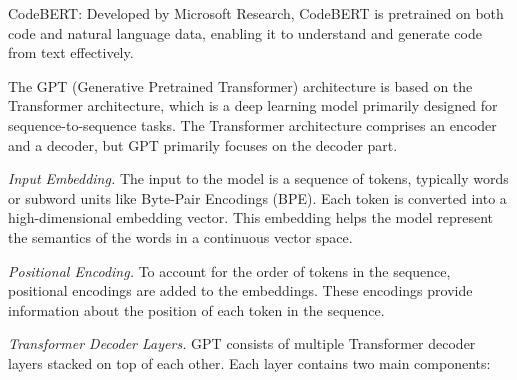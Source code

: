 
CodeBERT: Developed by Microsoft Research, CodeBERT is pretrained on both code and natural language data, enabling it to understand and generate code from text effectively.


The GPT (Generative Pretrained Transformer) architecture is based on the Transformer architecture, which is a deep learning model primarily designed for sequence-to-sequence tasks. The Transformer architecture comprises an encoder and a decoder, but GPT primarily focuses on the decoder part.


{\em Input Embedding.} The input to the model is a sequence of tokens, typically words or subword units like Byte-Pair Encodings (BPE). Each token is converted into a high-dimensional embedding vector. This embedding helps the model represent the semantics of the words in a continuous vector space.


{\em Positional Encoding.} To account for the order of tokens in the sequence, positional encodings are added to the embeddings. These encodings provide information about the position of each token in the sequence.


{\em Transformer Decoder Layers.} GPT consists of multiple Transformer
decoder layers stacked on top of each other. Each layer contains two
main components:


